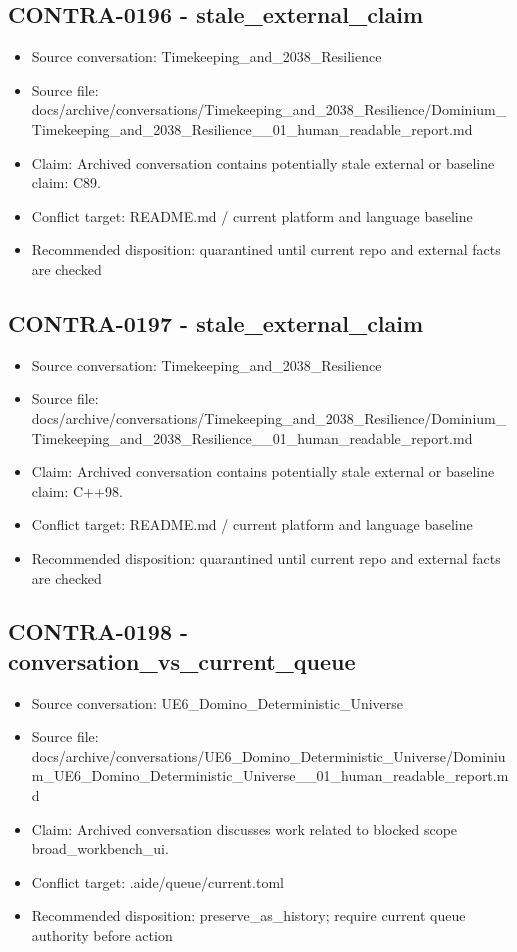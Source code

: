 \documentclass[11pt,a4paper]{report}
\begin{document}
\subsection{CONTRA-0196 - stale\_external\_claim}

\begin{itemize}
\item Source conversation: Timekeeping\_and\_2038\_Resilience
\item Source file: docs/archive/conversations/Timekeeping\_and\_2038\_Resilience/Dominium\_Timekeeping\_and\_2038\_Resilience\_\_01\_human\_readable\_report.md
\item Claim: Archived conversation contains potentially stale external or baseline claim: C89.
\item Conflict target: README.md / current platform and language baseline
\item Recommended disposition: quarantined until current repo and external facts are checked
\end{itemize}

\subsection{CONTRA-0197 - stale\_external\_claim}

\begin{itemize}
\item Source conversation: Timekeeping\_and\_2038\_Resilience
\item Source file: docs/archive/conversations/Timekeeping\_and\_2038\_Resilience/Dominium\_Timekeeping\_and\_2038\_Resilience\_\_01\_human\_readable\_report.md
\item Claim: Archived conversation contains potentially stale external or baseline claim: C++98.
\item Conflict target: README.md / current platform and language baseline
\item Recommended disposition: quarantined until current repo and external facts are checked
\end{itemize}

\subsection{CONTRA-0198 - conversation\_vs\_current\_queue}

\begin{itemize}
\item Source conversation: UE6\_Domino\_Deterministic\_Universe
\item Source file: docs/archive/conversations/UE6\_Domino\_Deterministic\_Universe/Dominium\_UE6\_Domino\_Deterministic\_Universe\_\_01\_human\_readable\_report.md
\item Claim: Archived conversation discusses work related to blocked scope broad\_workbench\_ui.
\item Conflict target: .aide/queue/current.toml
\item Recommended disposition: preserve\_as\_history; require current queue authority before action
\end{itemize}
\end{document}
